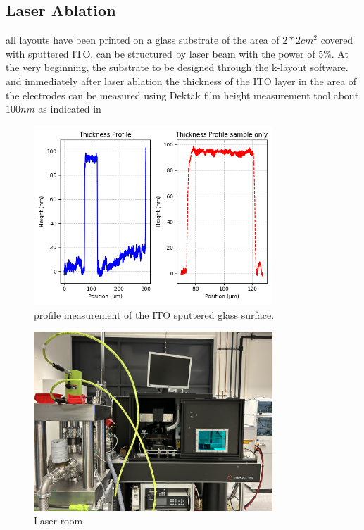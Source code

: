 \subsection {Laser Ablation}
\label{Substrate preparation}
 all layouts have been printed on a glass substrate of the area of $2*2 cm^2$ covered with sputtered ITO, can be structured by laser beam with the power of $5\%$. At the very beginning, the substrate to be designed through the k-layout software. and immediately after laser ablation the thickness of the ITO layer in the area of the electrodes can be measured using Dektak film height measurement tool about $100nm$ as indicated in
\begin{figure}[h!]
\centering
\includegraphics[width=0.8\textwidth]{figures/ITO.csv.png}
\caption[Example of caption.]{profile measurement of the ITO sputtered glass surface.\label{ito}}
\end{figure}

\begin{figure}[h!]
\centering
\includegraphics[width=0.8\textwidth]
{figures/laserroom.png}
\caption[Example of caption.]{Laser room\label{laserroom}}
\end{figure}



